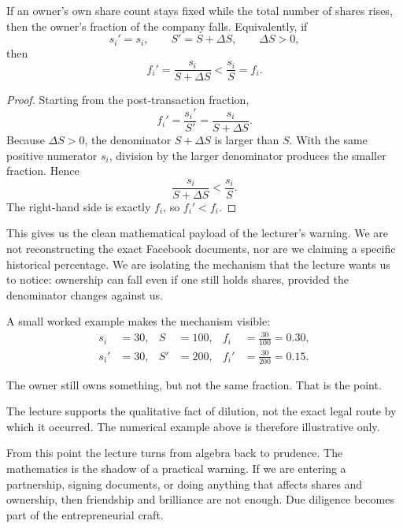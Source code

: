 \begin{proposition}
If an owner's own share count stays fixed while the total number of shares rises, then the owner's fraction of the company falls. Equivalently, if
\begin{equation}
s_i' = s_i,
\qquad
S' = S + \Delta S,
\qquad
\Delta S > 0,
\end{equation}
then
\begin{equation}
f_i' = \frac{s_i}{S+\Delta S} < \frac{s_i}{S} = f_i.
\end{equation}
\end{proposition}

\begin{proof}
Starting from the post-transaction fraction,
\[
f_i' = \frac{s_i'}{S'} = \frac{s_i}{S+\Delta S}.
\]
Because \(\Delta S>0\), the denominator \(S+\Delta S\) is larger than \(S\). With the same positive numerator \(s_i\), division by the larger denominator produces the smaller fraction. Hence
\[
\frac{s_i}{S+\Delta S} < \frac{s_i}{S}.
\]
The right-hand side is exactly \(f_i\), so \(f_i' < f_i\).
\end{proof}

This gives us the clean mathematical payload of the lecturer's warning. We are not reconstructing the exact Facebook documents, nor are we claiming a specific historical percentage. We are isolating the mechanism that the lecture wants us to notice: ownership can fall even if one still holds shares, provided the denominator changes against us.

A small worked example makes the mechanism visible:
\begin{align}
s_i &= 30, &
S &= 100, &
f_i &= \frac{30}{100} = 0.30,
\\
s_i' &= 30, &
S' &= 200, &
f_i' &= \frac{30}{200} = 0.15.
\end{align}

The owner still owns something, but not the same fraction. That is the point.

\begin{remark}
The lecture supports the qualitative fact of dilution, not the exact legal route by which it occurred. The numerical example above is therefore illustrative only.
\end{remark}

From this point the lecture turns from algebra back to prudence. The mathematics is the shadow of a practical warning. If we are entering a partnership, signing documents, or doing anything that affects shares and ownership, then friendship and brilliance are not enough. Due diligence becomes part of the entrepreneurial craft.

